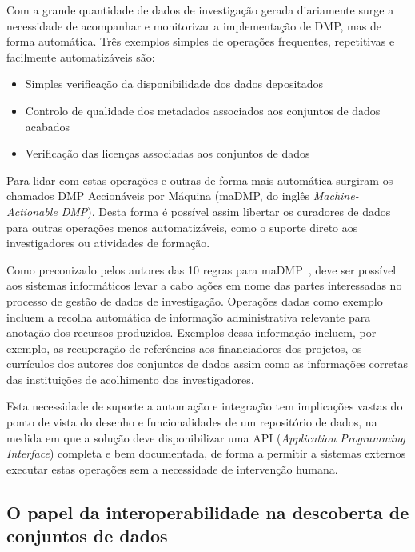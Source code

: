 \documentclass[sigconf,nonacm]{acmart}
\begin{document}
Com a grande quantidade de dados de investigação gerada diariamente surge a necessidade de acompanhar e monitorizar a implementação de DMP, mas de forma automática. Três exemplos simples de operações frequentes, repetitivas e facilmente automatizáveis são: 

\begin{itemize}
    \item Simples verificação da disponibilidade dos dados depositados
    \item Controlo de qualidade dos metadados associados aos conjuntos de dados acabados
    \item Verificação das licenças associadas aos conjuntos de dados
\end{itemize}

Para lidar com estas operações e outras de forma mais automática surgiram os chamados DMP Accionáveis por Máquina (maDMP, do inglês \textit{Machine-Actionable DMP}). Desta forma é possível assim libertar os curadores de dados para outras operações menos automatizáveis, como o suporte direto aos investigadores ou atividades de formação.

Como preconizado pelos autores das 10 regras para maDMP~\cite{miksa_tomasz_2018_1172673}, deve ser possível aos sistemas informáticos levar a cabo ações em nome das partes interessadas no processo de gestão de dados de investigação. Operações dadas como exemplo incluem a recolha automática de informação administrativa relevante para anotação dos recursos produzidos. Exemplos dessa informação incluem, por exemplo, as recuperação de referências aos financiadores dos projetos, os currículos dos autores dos conjuntos de dados assim como as informações corretas das instituições de acolhimento dos investigadores. 

Esta necessidade de suporte a automação e integração tem implicações vastas do ponto de vista do desenho e funcionalidades de um repositório de dados, na medida em que a solução deve disponibilizar uma API (\textit{Application Programming Interface}) completa e bem documentada, de forma a permitir a sistemas externos executar estas operações sem a necessidade de intervenção humana.

\subsection{O papel da interoperabilidade na descoberta de conjuntos de dados} %
\label{sub:o_papel_da_interoperabilidade_na_descoberta_de_conjuntos_de_dados}
\end{document}
